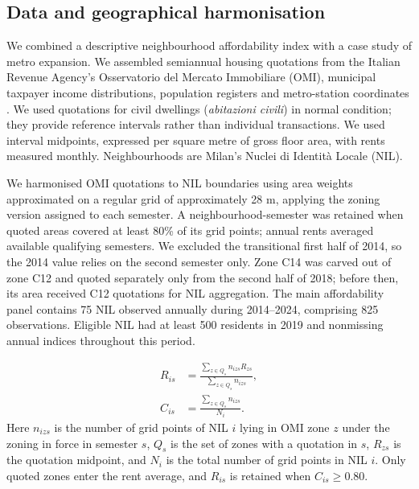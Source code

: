 
\subsection*{Data and geographical harmonisation}
We combined a descriptive neighbourhood affordability index with a case study of metro expansion. We assembled semiannual housing quotations from the Italian Revenue Agency's Osservatorio del Mercato Immobiliare (OMI), municipal taxpayer income distributions, population registers and metro-station coordinates \cite{milano_omi,milano_irpef,milano_population,milano_atm}. We used quotations for civil dwellings (\emph{abitazioni civili}) in normal condition; they provide reference intervals rather than individual transactions. We used interval midpoints, expressed per square metre of gross floor area, with rents measured monthly. Neighbourhoods are Milan's Nuclei di Identit\`a Locale (NIL).

We harmonised OMI quotations to NIL boundaries using area weights approximated on a regular grid of approximately 28 m, applying the zoning version assigned to each semester. A neighbourhood-semester was retained when quoted areas covered at least 80\% of its grid points; annual rents averaged available qualifying semesters. We excluded the transitional first half of 2014, so the 2014 value relies on the second semester only. Zone C14 was carved out of zone C12 and quoted separately only from the second half of 2018; before then, its area received C12 quotations for NIL aggregation. The main affordability panel contains 75 NIL observed annually during 2014--2024, comprising 825 observations. Eligible NIL had at least 500 residents in 2019 and nonmissing annual indices throughout this period.

\begin{equation}
\begin{aligned}
R_{is}&=\frac{\sum_{z\in Q_s} n_{izs}R_{zs}}{\sum_{z\in Q_s} n_{izs}},\\
C_{is}&=\frac{\sum_{z\in Q_s} n_{izs}}{N_i}.
\end{aligned}
\label{eq:omi_nil}
\end{equation}
Here $n_{izs}$ is the number of grid points of NIL $i$ lying in OMI zone $z$ under the zoning in force in semester $s$, $Q_s$ is the set of zones with a quotation in $s$, $R_{zs}$ is the quotation midpoint, and $N_i$ is the total number of grid points in NIL $i$. Only quoted zones enter the rent average, and $R_{is}$ is retained when $C_{is}\geq 0.80$.

